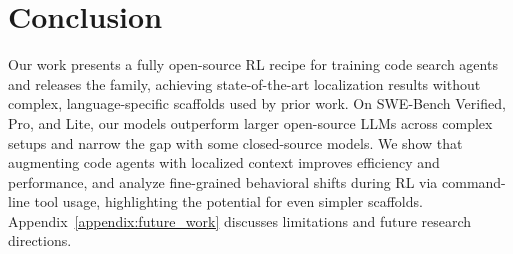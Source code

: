 \section{Conclusion}
Our work presents a fully open-source RL recipe for training code search agents and releases the \methodname family, achieving state-of-the-art localization results without complex, language-specific scaffolds used by prior work. On SWE-Bench Verified, Pro, and Lite, our models outperform larger open-source LLMs across complex setups and narrow the gap with some closed-source models. We show that augmenting code agents with localized context improves efficiency and performance, and analyze fine-grained behavioral shifts during RL via command-line tool usage, highlighting the potential for even simpler scaffolds. Appendix~\ref{appendix:future_work} discusses limitations and future research directions.